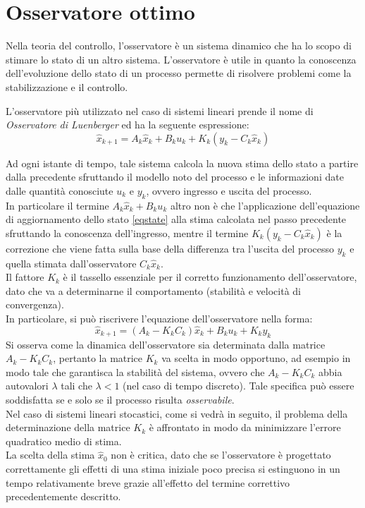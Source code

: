 \section{Osservatore ottimo}
Nella teoria del controllo, l'osservatore è un sistema dinamico che ha lo scopo di stimare lo stato di un altro sistema. L'osservatore è utile in quanto la conoscenza dell'evoluzione dello stato di un processo permette di risolvere problemi come la stabilizzazione e il controllo.

L'osservatore più utilizzato nel caso di sistemi lineari prende il nome di \textit{Osservatore di Luenberger}\cite{bolzern} ed ha la seguente espressione:
\begin{equation}
\label{obsv}
\hat{x}_{k+1}=A_k\hat{x}_k+B_ku_k+K_k(y_k-C_k\hat{x}_k)
\end{equation}

Ad ogni istante di tempo, tale sistema calcola la nuova stima dello stato a partire dalla precedente sfruttando il modello noto del processo e le informazioni date dalle quantità conosciute $u_k$ e $y_k$, ovvero ingresso e uscita del processo. \\
In particolare il termine $A_k\hat{x}_k+B_ku_k$ altro non è che l'applicazione dell'equazione di aggiornamento dello stato \eqref{eqstate} alla stima calcolata nel passo precedente sfruttando la conoscenza dell'ingresso, mentre il termine $K_k(y_k-C_k\hat{x}_k)$ è la correzione che viene fatta sulla base della differenza tra l'uscita del processo $y_k$ e quella stimata dall'osservatore $C_k\hat{x}_k$.\\
Il fattore $K_k$ è il tassello essenziale per il corretto funzionamento dell'osservatore, dato che va a determinarne il comportamento (stabilità e velocità di convergenza).\\
In particolare, si può riscrivere l'equazione dell'osservatore nella forma:
\begin{equation}
\label{obsv2}
\hat{x}_{k+1}=(A_k-K_kC_k)\hat{x}_k+B_ku_k+K_ky_k
\end{equation}
Si osserva come la dinamica dell'osservatore sia determinata dalla matrice $A_k-K_kC_k$, pertanto la matrice $K_k$ va scelta in modo opportuno, ad esempio in modo tale che garantisca la stabilità del sistema, ovvero che $A_k-K_kC_k$ abbia autovalori $\lambda$ tali che $\lambda<1$ (nel caso di tempo discreto). Tale specifica può essere soddisfatta se e solo se il processo risulta \textit{osservabile}.\\
Nel caso di sistemi lineari stocastici, come si vedrà in seguito, il problema della determinazione della matrice $K_k$ è affrontato in modo da minimizzare l'errore quadratico medio di stima.\\
La scelta della stima $\hat{x}_0$ non è critica, dato che se l'osservatore è progettato correttamente gli effetti di una stima iniziale poco precisa si estinguono in un tempo relativamente breve grazie all'effetto del termine correttivo precedentemente descritto.

